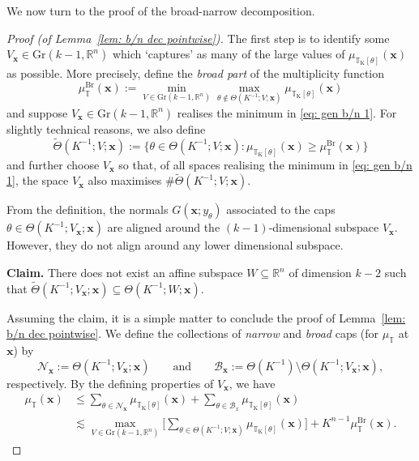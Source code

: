 \documentclass[reqno]{amsart}
\numberwithin{equation}{section}
\newcommand{\R}{\mathbb{R}}
\newcommand{\T}{\mathbb{T}}
\newcommand{\cB}{\mathcal{B}}
\newcommand{\bx}{\mathbf{x}}
\theoremstyle{plain}
\theoremstyle{definition}
\begin{document}
We now turn to the proof of the broad-narrow decomposition.

\begin{proof}[Proof (of Lemma~\ref{lem: b/n dec pointwise})] The first step is to identify some $V_{\bx} \in \mathrm{Gr}(k-1,\R^n)$ which `captures' as many of the large values of $\mu_{\T_{\mathrm{K}}[\theta]}(\bx)$ as possible. More precisely, define the \textit{broad part} of the multiplicity function
\begin{equation}\label{eq: gen b/n 1} 
    \mu_{\T}^{\mathrm{Br}}(\bx) := \min_{V \in \mathrm{Gr}(k-1,\R^n)} \max_{\theta \notin \Theta(K^{-1}; V; \bx)} \mu_{\T_{\mathrm{K}}[\theta]}(\bx)
\end{equation}
and suppose $V_{\bx} \in \mathrm{Gr}(k-1,\R^n)$ realises the minimum in \eqref{eq: gen b/n 1}. For slightly technical reasons, we also define 
\begin{equation}\label{eq: gen b/n 2} 
    \widetilde{\Theta}(K^{-1}; V; \bx) := \big\{ \theta \in \Theta(K^{-1}; V; \bx) : \mu_{\T_{\mathrm{K}}[\theta]}(\bx) \geq \mu_{\T}^{\mathrm{Br}}(\bx) \big\}
\end{equation}
and further choose $V_{\bx}$ so that, of all spaces realising the minimum in \eqref{eq: gen b/n 1}, the space $V_{\bx}$ also maximises $\#\widetilde{\Theta}(K^{-1}; V; \bx)$. 

From the definition, the normals $G(\bx;y_{\theta})$ associated to the caps $\theta \in \Theta(K^{-1}; V_{\bx}; \bx)$ are aligned around the $(k-1)$-dimensional subspace $V_{\bx}$. However, they do not align around any lower dimensional subspace. \medskip

\noindent \textbf{Claim.} There does not exist an affine subspace $W \subseteq \R^n$ of dimension $k-2$ such that $\widetilde{\Theta}(K^{-1}; V_{\bx}; \bx) \subseteq \Theta(K^{-1}; W; \bx)$. \medskip

Assuming the claim, it is a simple matter to conclude the proof of Lemma~\ref{lem: b/n dec pointwise}. We define the collections of \textit{narrow} and \textit{broad} caps (for $\mu_{\T}$ at $\bx$) by
\begin{equation*}
    \mathcal{N}_{\bx} := \Theta(K^{-1}; V_{\bx}; \bx) \qquad \textrm{and} \qquad  \cB_{\bx} := \Theta(K^{-1}) \setminus \Theta(K^{-1}; V_{\bx}; \bx),
\end{equation*}
respectively. By the defining properties of $V_{\bx}$, we have
\begin{align*}
    \mu_{\T}(\bx) &\leq  \sum_{\theta \in \mathcal{N}_{\bx}} \mu_{\T_{\mathrm{K}}[\theta]}(\bx)  + \sum_{\theta \in \cB_x} \mu_{\T_{\mathrm{K}}[\theta]}(\bx)  \\
    &\lesssim \max_{V \in \mathrm{Gr}(k-1,\R^n)} \Big[ \sum_{\theta \in \Theta(K^{-1}; V; \bx)} \mu_{\T_{\mathrm{K}}[\theta]}(\bx) \Big]  + 
 K^{n-1} \mu_{\T}^{\mathrm{Br}}(\bx).   
\end{align*}


\end{proof}
\end{document}
